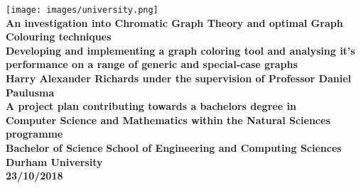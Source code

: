 \documentclass[12pt, a4paper]{article}
\begin{document}
\renewcommand\refname{Bibliography}
\pagestyle{MainStyle}








\begin{titlepage}
\begin{center}
\texttt{[image: images/university.png]}\\

\vspace*{4cm}
{\fontsize{20}{12}\textbf{An investigation into Chromatic Graph Theory and optimal Graph Colouring techniques}}\\
\vspace{1cm}
{\fontsize{12}{10}\textbf{Developing and implementing a graph coloring tool and analysing it's performance on a range of generic and special-case graphs}}\\
\vspace{2cm}        
\textbf{Harry Alexander Richards under the supervision of Professor Daniel Paulusma}\\
\vspace{1cm}     
\textbf{A project plan contributing towards a bachelors degree in\\ Computer Science and Mathematics within the Natural Sciences programme\\
Bachelor of Science}
\vspace{1cm}        
\textbf{School of Engineering and Computing Sciences\\
Durham University\\
23/10/2018}
\end{center}
\end{titlepage}
\end{document}
